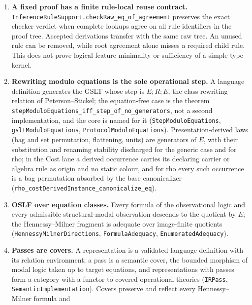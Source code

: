 \documentclass[11pt]{article}
\theoremstyle{definition}
\theoremstyle{remark}
\begin{document}
\begin{enumerate}
  existing conversion exactness on the image has refined endpoints. An open
  higher-order specialization supplies a capture-sensitive control. Exact
  recovery of internal type annotations remains refuted for this raw erasure,
  and full HOL consequence or inhabitation reflection is not inferred.
\item \textbf{A fixed proof has a finite rule-local reuse contract.}
  \nolinkurl{InferenceRuleSupport.checkRaw_eq_of_agreement} preserves the exact
  checker verdict when complete lookups agree on all rule identifiers in
  the proof tree. Accepted derivations transfer with the same raw tree.
  An unused rule can be removed, while root agreement alone misses a
  required child rule. This does not prove logical-feature minimality or
  sufficiency of a simple-type kernel.
\item \textbf{Rewriting modulo equations is the sole operational step.}  A
  language definition generates the GSLT whose step is $E;R;E$, the class
  rewriting relation of Peterson--Stickel; the equation-free case is the
  theorem \nolinkurl{stepModuloEquations_iff_step_of_no_generators}, not a
  second implementation, and the core is named for it
  (\texttt{StepModuloEquations}, \texttt{gsltModuloEquations},
  \nolinkurl{ProtocolModuloEquations}).  Presentation-derived laws (bag and set
  permutation, flattening, units) are generators of $E$, with their
  substitution and renaming stability discharged for the generic case and
  for rho; in the Cost lane a derived occurrence carries its declaring
  carrier or algebra rule as origin and no static colour, and for rho every
  such occurrence is a bag permutation absorbed by the base canonicalizer
  (\nolinkurl{rho_costDerivedInstance_canonicalize_eq}).
\item \textbf{OSLF over equation classes.}  Every formula of the observational
  logic and every admissible structural-modal observation descends to the
  quotient by $E$; the Hennessy--Milner fragment is adequate over
  image-finite quotients (\nolinkurl{HennessyMilnerDirections},
  \texttt{FormulaAdequacy}, \texttt{EnumeratedAdequacy}).
\item \textbf{Passes are covers.}  A representation is a validated language
  definition with its relation environment; a pass is a semantic cover,
  the bounded morphism of modal logic taken up to target equations, and
  representations with passes form a category with a functor to covered
  operational theories (\texttt{IRPass}, \nolinkurl{SemanticImplementation}).
  Covers preserve and reflect every Hennessy--Milner formula and

\end{enumerate}
\end{document}
